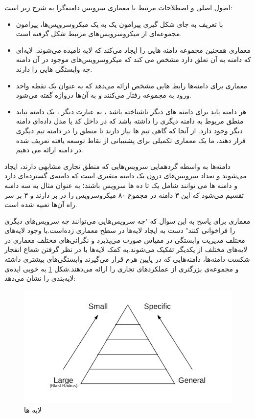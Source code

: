 اصول اصلی و اصطلاحات مرتبط با معماری سرویس دامنه‌گرا به شرح زیر است:
\begin{itemize}
\item 
با تعریف  به جای شکل گیری پیرامون یک به یک میکروسرویس‌ها، پیرامون مجموعه‌ای از میکروسرویس‌های مرتبط شکل گرفته است.
\item
معماری  همچنین مجموعه دامنه هایی را ایجاد می‌کند که لایه نامیده می‌شوند. لایه‌ای که دامنه به آن تعلق دارد مشخص می کند که میکروسرویس‌های موجود در آن دامنه چه وابستگی هایی را دارند.
\item
معماری برای دامنه‌ها رابط هایی مشخص ارائه می‌دهد که به عنوان یک نقطه واحد ورود به مجموعه رفتار می‌کنند و به آن‌ها دروازه گفته می‌شود.
\item
هر دامنه باید برای دامنه های دیگر ناشناخته باشد ، به عبارت دیگر ، یک دامنه نباید منطق مربوط به دامنه دیگری را داشته باشد که در داخل کد یا مدل داده‌‌ای دامنه دیگر وجود دارد. از آنجا که گاهی تیم ها نیاز دارند تا منطق را در دامنه تیم دیگری قرار دهند، ما یک معماری تکمیلی برای پشتیبانی از نقاط توسعه یافته تعریف شده در دامنه ارائه می دهیم.
\end{itemize}

دامنه‌ها به واسطه گردهمایی سرویس‌هایی که منطق تجاری مشابهی دارند، ایجاد می‌شوند و تعداد سرویس‌های درون یک دامنه متغیری است که دامنه‌ی گسترده‌ای دارد و دامنه ها می توانند شامل یک تا ده ها سرویس باشند؛ به عنوان مثال  به سه دامنه تقسیم می‌شود که این ۳ دامنه در مجموع ۸۰ میکروسرویس را در بر دارند و ۳  بر سر راه آن‌ها تعبیه شده است.

معماری  برای پاسخ به این سوال که "چه سرویس‌هایی می‌توانند چه سرویس‌های دیگری را فراخوانی کنند" دست به ایجاد لایه‌ها در سطح معماری زده‌است.با وجود لایه‌های مختلف مدیریت وابستگی در مقیاس صورت می‌پذیرد و نگرانی‌های مختلف معماری در لایه‌‌های مختلف از یکدیگر تفکیک می‌شوند.به کمک لایه‌ها با در نظر گرفتن شعاع انفجار شکست  دامنه‌ها، دامنه‌هایی که در پایین هرم قرار می‌گیرند وابستگی‌‌های بیشتری داشته و مجموعه‌ی بزرگتری از عملکرد‌‌های تجاری را ارائه می‌دهند.شکل \ref{fig:layers} به خوبی ایده‌ی لایه‌بندی را نشان می‌دهد:

\begin{figure}[h]
\centering
\includegraphics[scale=0.5]{layers.png}
\caption{لایه ها}
\label{fig:layers}
\end{figure}

